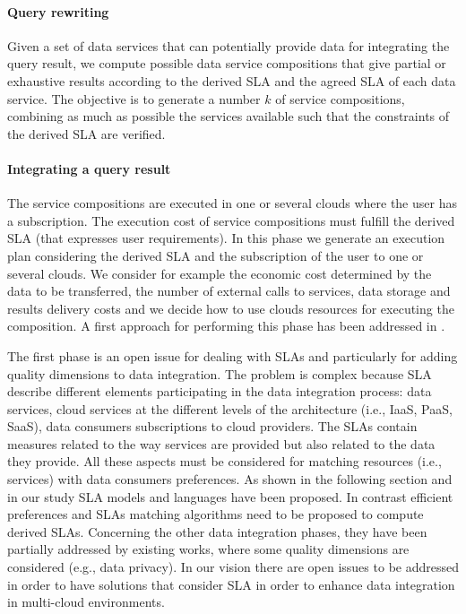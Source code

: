 \paragraph{Query rewriting} 
Given a set of data services that can potentially provide data for integrating the query result, we compute possible data service compositions that give partial or exhaustive  results according to the derived SLA and the agreed SLA of each data service. The objective is to   generate a number $k$ of service compositions, combining as much as possible the services available such that the constraints of the derived SLA are verified. 


\paragraph{Integrating a query result} 
The service compositions are executed in one or several clouds where the user has a subscription. The execution cost of  service compositions must fulfill the derived SLA (that expresses user requirements). In this phase we generate an execution plan  considering the derived SLA and the subscription of the user to one or several clouds. We consider for example the economic cost determined by the data to be transferred, the number of external calls to services, data storage and results delivery costs and we decide how to use clouds resources for executing the composition. A first approach for performing this phase has been addressed  in  \cite{Lopez14}.

The first phase is an open issue for dealing with SLAs and particularly for adding quality dimensions to  data integration. The problem is complex because SLA describe different elements participating in the data integration process: data services, cloud services at the different levels of the architecture (i.e., IaaS, PaaS, SaaS), data consumers subscriptions to cloud providers. The SLAs contain measures related to the way services are provided but also related to the data they provide. All these aspects must be considered for matching resources (i.e., services) with data consumers preferences. As shown in the following section and in our study SLA models and languages have been proposed. In contrast  efficient preferences and SLAs matching algorithms need to be proposed to compute derived SLAs. Concerning the other data integration phases, they have been partially addressed by existing works, where some quality dimensions are considered (e.g., data privacy). In our vision there are open issues to be addressed in order to have solutions that consider SLA in order to enhance data integration in multi-cloud environments. 

